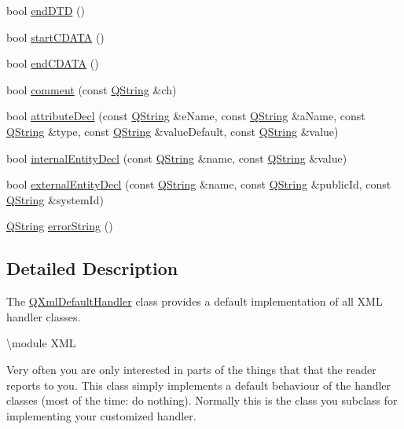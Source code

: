 \begin{DoxyCompactItemize}
\item 
bool \mbox{\hyperlink{class_q_xml_default_handler_abc0de9f5db640394347d6c8c4c416c84}{end\+D\+TD}} ()
\item 
bool \mbox{\hyperlink{class_q_xml_default_handler_ae6df0d67f6537d36d5d2b0261e2251aa}{start\+C\+D\+A\+TA}} ()
\item 
bool \mbox{\hyperlink{class_q_xml_default_handler_abd9e489248fd5df14d69ad0acf16aa80}{end\+C\+D\+A\+TA}} ()
\item 
bool \mbox{\hyperlink{class_q_xml_default_handler_ae9bce8afae331e60c626f61646f20465}{comment}} (const \mbox{\hyperlink{class_q_string}{Q\+String}} \&ch)
\item 
bool \mbox{\hyperlink{class_q_xml_default_handler_a59b03fd7d0242d1172a4e5d8cc8154db}{attribute\+Decl}} (const \mbox{\hyperlink{class_q_string}{Q\+String}} \&e\+Name, const \mbox{\hyperlink{class_q_string}{Q\+String}} \&a\+Name, const \mbox{\hyperlink{class_q_string}{Q\+String}} \&type, const \mbox{\hyperlink{class_q_string}{Q\+String}} \&value\+Default, const \mbox{\hyperlink{class_q_string}{Q\+String}} \&value)
\item 
bool \mbox{\hyperlink{class_q_xml_default_handler_a3bb2a9a06a78ec957e3fed5a909a8e1c}{internal\+Entity\+Decl}} (const \mbox{\hyperlink{class_q_string}{Q\+String}} \&name, const \mbox{\hyperlink{class_q_string}{Q\+String}} \&value)
\item 
bool \mbox{\hyperlink{class_q_xml_default_handler_ac66a6f6bd7275b4515c21c6542a84138}{external\+Entity\+Decl}} (const \mbox{\hyperlink{class_q_string}{Q\+String}} \&name, const \mbox{\hyperlink{class_q_string}{Q\+String}} \&public\+Id, const \mbox{\hyperlink{class_q_string}{Q\+String}} \&system\+Id)
\item 
\mbox{\hyperlink{class_q_string}{Q\+String}} \mbox{\hyperlink{class_q_xml_default_handler_afcbe5fdce86cea4b7863e752c2413c45}{error\+String}} ()
\end{DoxyCompactItemize}


\subsection{Detailed Description}
The \mbox{\hyperlink{class_q_xml_default_handler}{Q\+Xml\+Default\+Handler}} class provides a default implementation of all X\+ML handler classes. 

\textbackslash{}module X\+ML

Very often you are only interested in parts of the things that that the reader reports to you. This class simply implements a default behaviour of the handler classes (most of the time\+: do nothing). Normally this is the class you subclass for implementing your customized handler.

